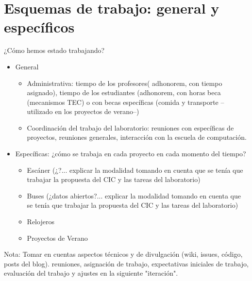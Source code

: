 \documentclass[conference]{IEEEtran}
\begin{document}
\section{Esquemas de trabajo: general y específicos}

¿Cómo hemos estado trabajando?

\begin{itemize}

\item General
    
    \begin{itemize}
    
    \item Administrativa: tiempo de los profesores( adhonorem, con tiempo asignado), tiempo de los estudiantes (adhonorem, con horas beca (mecanismos TEC) o con becas específicas (comida y transporte --utilizado en los proyectos de verano--)
    
    \item Coordinación del trabajo del laboratorio: reuniones con específicas de proyectos, reuniones generales, interacción con la escuela de computación.
    
    \end{itemize}

\item Específicas: ¿cómo se trabaja en cada proyecto en cada momento del tiempo?
    
    \begin{itemize}
    \item Escáner (¿?... explicar la modalidad tomando en cuenta que se tenía que trabajar la propuesta del CIC y las tareas del laboratorio)
    
    \item Buses (¿datos abiertos?... explicar la modalidad tomando en cuenta que se tenía que trabajar la propuesta del CIC y las tareas del laboratorio)
    
    \item Relojeros
    
    \item Proyectos de Verano

    \end{itemize}


\end{itemize}
  
Nota: Tomar en cuentas aspectos técnicos y de divulgación (wiki, issues, código, posts del blog).  reuniones, asignación de trabajo, expectativas iniciales de trabajo, evaluación del trabajo y ajustes en la siguiente "iteración". 
\end{document}

